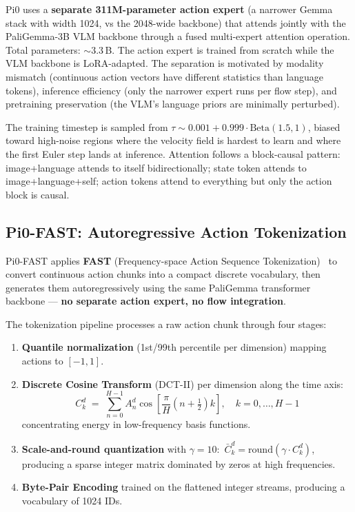 \documentclass[11pt,letterpaper]{article}
\begin{document}
Pi0 uses a \textbf{separate 311M-parameter action expert} (a narrower Gemma stack with width 1024, vs the 2048-wide backbone) that attends jointly with the PaliGemma-3B VLM backbone through a fused multi-expert attention operation. Total parameters: $\sim$3.3\,B. The action expert is trained from scratch while the VLM backbone is LoRA-adapted. The separation is motivated by modality mismatch (continuous action vectors have different statistics than language tokens), inference efficiency (only the narrower expert runs per flow step), and pretraining preservation (the VLM's language priors are minimally perturbed).

The training timestep is sampled from $\tau \sim 0.001 + 0.999 \cdot \text{Beta}(1.5, 1)$, biased toward high-noise regions where the velocity field is hardest to learn and where the first Euler step lands at inference. Attention follows a block-causal pattern: image+language attends to itself bidirectionally; state token attends to image+language+self; action tokens attend to everything but only the action block is causal.

\subsection{Pi0-FAST: Autoregressive Action Tokenization}

Pi0-FAST applies \textbf{FAST} (Frequency-space Action Sequence Tokenization)~\cite{pertsch2025fast} to convert continuous action chunks into a compact discrete vocabulary, then generates them autoregressively using the same PaliGemma transformer backbone --- \textbf{no separate action expert, no flow integration}.

The tokenization pipeline processes a raw action chunk through four stages:

\begin{enumerate}[noitemsep,topsep=2pt]
  \item \textbf{Quantile normalization} (1st/99th percentile per dimension) mapping actions to $[-1, 1]$.
  \item \textbf{Discrete Cosine Transform} (DCT-II) per dimension along the time axis:
    \begin{equation}
      C^d_k \;=\; \sum_{n=0}^{H-1} A^d_n \cos\!\left[\frac{\pi}{H}\!\left(n+\tfrac{1}{2}\right)k\right]\!, \quad k=0,\dots,H-1
    \end{equation}
    concentrating energy in low-frequency basis functions.
  \item \textbf{Scale-and-round quantization} with $\gamma = 10$:\, $\bar{C}^d_k = \mathrm{round}(\gamma \cdot C^d_k)$, producing a sparse integer matrix dominated by zeros at high frequencies.
  \item \textbf{Byte-Pair Encoding} trained on the flattened integer streams, producing a vocabulary of 1024 IDs.
\end{enumerate}
\end{document}
